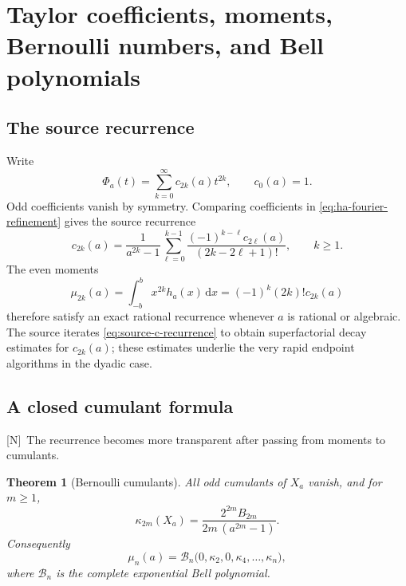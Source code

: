 \documentclass[11pt,oneside]{article}
\newtheorem{theorem}{Theorem}[section]
\theoremstyle{definition}
\theoremstyle{remark}
\newcommand{\dd}{\,\mathrm d}
\newcommand{\Nmark}{\textcolor{newgreen}{\textsf{[N]}}}
\begin{document}
\section{Taylor coefficients, moments, Bernoulli numbers, and Bell polynomials}
\label{sec:moments}

\subsection{The source recurrence}

Write
\begin{equation}
 \Phi_a(t)=\sum_{k=0}^{\infty}c_{2k}(a)t^{2k},
 \qquad c_0(a)=1.
 \label{eq:coefficient-expansion}
\end{equation}
Odd coefficients vanish by symmetry.  Comparing coefficients in
\eqref{eq:ha-fourier-refinement} gives the source recurrence
\begin{equation}
 c_{2k}(a)=\frac1{a^{2k}-1}
 \sum_{\ell=0}^{k-1}
 \frac{(-1)^{k-\ell}c_{2\ell}(a)}{(2k-2\ell+1)!},
 \qquad k\ge1.
 \tag{S3.32}
 \label{eq:source-c-recurrence}
\end{equation}
The even moments
\begin{equation}
 \mu_{2k}(a)=\int_{-b}^{b}x^{2k}h_a(x)\dd x
            =(-1)^k(2k)!c_{2k}(a)
 \tag{S3.36--S3.37}
 \label{eq:moment-coefficient}
\end{equation}
therefore satisfy an exact rational recurrence whenever $a$ is rational or algebraic.
The source iterates \eqref{eq:source-c-recurrence} to obtain superfactorial decay estimates
for $c_{2k}(a)$; these estimates underlie the very rapid endpoint algorithms in the dyadic
case.

\subsection{A closed cumulant formula}

\Nmark\ The recurrence becomes more transparent after passing from moments to cumulants.

\begin{theorem}[Bernoulli cumulants]
\label{thm:cumulants}
All odd cumulants of $X_a$ vanish, and for $m\ge1$,
\begin{equation}
 \boxed{\quad
 \kappa_{2m}(X_a)=
 \frac{2^{2m}B_{2m}}{2m\,(a^{2m}-1)}.
 \quad}
 \label{eq:cumulant-formula}
\end{equation}
Consequently
\begin{equation}
 \mu_n(a)=\mathcal B_n\bigl(0,\kappa_2,0,\kappa_4,\ldots,\kappa_n\bigr),
 \label{eq:Bell-moments}
\end{equation}
where $\mathcal B_n$ is the complete exponential Bell polynomial.
\end{theorem}
\end{document}
